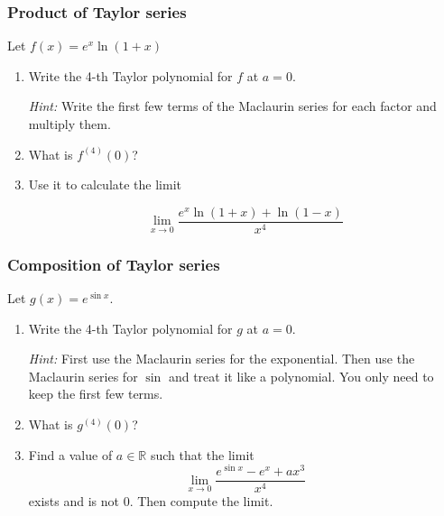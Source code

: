 \documentclass[14pt]{beamer}
\begin{document}
\begin{frame}[t]
	\frametitle{Product of Taylor series}

	Let $\displaystyle f(x) = e^{x}\ln(1+x)$
	\vspace{.2cm}

	\begin{enumerate}
		\item Write the 4-th Taylor polynomial for $f$ at $a=0$.
			\vspace{.2cm}

			{\fontsize{11}{11}\selectfont \emph{Hint:} Write the first few terms of the Maclaurin series for each factor and multiply them. }
			\vspace{.5cm}

		\item What is $\displaystyle f^{(4)}(0)$?
			\vspace{.5cm}


		\item Use it to calculate the limit

			\[
				\lim_{x \to 0}\frac{e^{x}\ln(1+x) + \ln(1-x)}{x^{4}}
			\]
	\end{enumerate}
\end{frame}

\begin{frame}[t]
	\fontsize{13}{13}\selectfont
	\frametitle{Composition of Taylor series}

	Let $\displaystyle g(x) = e^{\sin x}$.
	\vspace{.2cm}

	\begin{enumerate}
		\item Write the 4-th Taylor polynomial for $g$ at $a=0$.
			\vspace{.2cm}

			{\fontsize{11}{11}\selectfont \emph{Hint:} First use the Maclaurin series for the exponential. Then use the Maclaurin series for $\sin$ and treat it like a polynomial. You only need to keep the first few terms. }
			\vspace{.2cm}


		\item What is $\displaystyle g^{(4)}(0)$?
			\vspace{.2cm}


		\item Find a value of $a \in \mathbb{R}$ such that the limit
			\[
				\lim_{x \to 0}\frac{e^{\sin x}- e^{x}+ ax^{3}}{x^{4}}
			\]
			exists and is not 0. Then compute the limit.
	\end{enumerate}
\end{frame}
\end{document}
